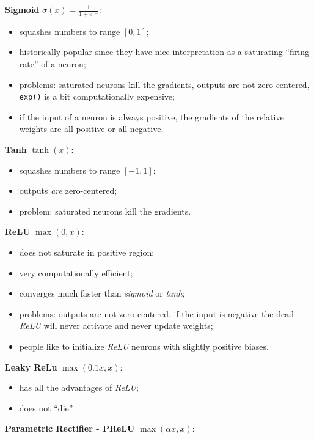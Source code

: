 \begin{myitem}
    \item \textbf{Sigmoid} $\sigma(x) = \frac{1}{1 + e^{-x}}$:
    \begin{itemize}
        \item squashes numbers to range $[0,1]$;
        \item historically popular since they have nice interpretation as a saturating “firing rate” of a neuron;
        \item problems: saturated neurons kill the gradients, outputs are not zero-centered, \texttt{exp()} is a bit computationally expensive;
        \item if the input of a neuron is always positive, the gradients of the relative weights are all positive or all negative.
    \end{itemize}
    \item \textbf{Tanh} $\tanh(x)$:
    \begin{itemize}
        \item squashes numbers to range $[-1,1]$;
        \item outputs \textit{are} zero-centered;
        \item problem: saturated neurons kill the gradients.
    \end{itemize}
    \item \textbf{ReLU} $\max(0,x)$:
    \begin{itemize}
        \item does not saturate in positive region;
        \item very computationally efficient;
        \item converges much faster than \textit{sigmoid} or \textit{tanh};
        \item problems: outputs are not zero-centered, if the input is negative the dead \textit{ReLU} will never activate and never update weights;
        \item people like to initialize \textit{ReLU} neurons with slightly positive biases.
    \end{itemize}
    \item \textbf{Leaky ReLu} $\max(0.1x,x)$:
    \begin{itemize}
        \item has all the advantages of \textit{ReLU};
        \item does not ``die''.
    \end{itemize}
    \item \textbf{Parametric Rectifier - PReLU} $\max(\alpha x, x)$:

\end{myitem}
